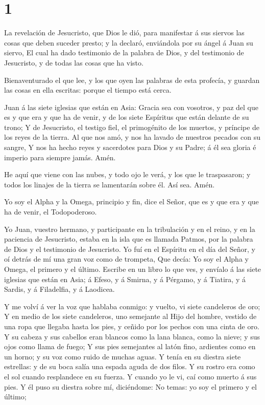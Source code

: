 \hypertarget{section}{%
\section{1}\label{section}}

 La revelación de Jesucristo, que Dios le dió, para
manifestar á sus siervos las cosas que deben suceder presto; y la
declaró, enviándola por su ángel á Juan su siervo,  El cual
ha dado testimonio de la palabra de Dios, y del testimonio de
Jesucristo, y de todas las cosas que ha visto.

 Bienaventurado el que lee, y los que oyen las palabras de
esta profecía, y guardan las cosas en ella escritas: porque el tiempo
está cerca.

 Juan á las siete iglesias que están en Asia: Gracia sea con
vosotros, y paz del que es y que era y que ha de venir, y de los siete
Espíritus que están delante de su trono;  Y de Jesucristo,
el testigo fiel, el primogénito de los muertos, y príncipe de los reyes
de la tierra. Al que nos amó, y nos ha lavado de nuestros pecados con su
sangre,  Y nos ha hecho reyes y sacerdotes para Dios y su
Padre; á él sea gloria é imperio para siempre jamás. Amén.

 He aquí que viene con las nubes, y todo ojo le verá, y los
que le traspasaron; y todos los linajes de la tierra se lamentarán sobre
él. Así sea. Amén.

 Yo soy el Alpha y la Omega, principio y fin, dice el Señor,
que es y que era y que ha de venir, el Todopoderoso.

 Yo Juan, vuestro hermano, y participante en la tribulación
y en el reino, y en la paciencia de Jesucristo, estaba en la isla que es
llamada Patmos, por la palabra de Dios y el testimonio de Jesucristo.
 Yo fuí en el Espíritu en el día del Señor, y oí detrás de
mí una gran voz como de trompeta,  Que decía: Yo soy el
Alpha y Omega, el primero y el último. Escribe en un libro lo que ves, y
envíalo á las siete iglesias que están en Asia; á Efeso, y á Smirna, y á
Pérgamo, y á Tiatira, y á Sardis, y á Filadelfia, y á Laodicea.

 Y me volví á ver la voz que hablaba conmigo: y vuelto, vi
siete candeleros de oro;  Y en medio de los siete
candeleros, uno semejante al Hijo del hombre, vestido de una ropa que
llegaba hasta los pies, y ceñido por los pechos con una cinta de oro.
 Y su cabeza y sus cabellos eran blancos como la lana
blanca, como la nieve; y sus ojos como llama de fuego;  Y
sus pies semejantes al latón fino, ardientes como en un horno; y su voz
como ruido de muchas aguas.  Y tenía en su diestra siete
estrellas: y de su boca salía una espada aguda de dos filos. Y su rostro
era como el sol cuando resplandece en su fuerza.  Y cuando
yo le vi, caí como muerto á sus pies. Y él puso su diestra sobre mí,
diciéndome: No temas: yo soy el primero y el último;

